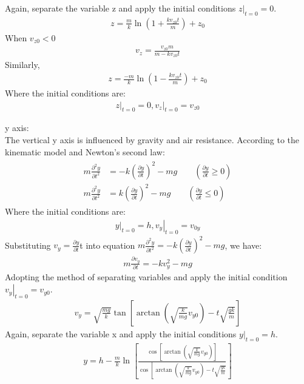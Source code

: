 Again, separate the variable z and apply the initial conditions $\left.z\right|_{t=0}=0$.
\begin{align}
     z=\frac{m}{k} \ln \left(1+\frac{k v_{z 0} t}{m}\right)+z_{0}   
\end{align}
When $v_{z 0}<0$
\begin{align}
    v_{z}=\frac{v_{z 0} m}{m-k v_{z 0} t}
\end{align}
Similarly,
\begin{align}
    z=\frac{-m}{k} \ln \left(1-\frac{k v_{z 0} t}{m}\right)+z_{0}
\end{align}
Where the initial conditions are:
\begin{align}
    \left.z\right|_{t=0}=0,\left.v_{z}\right|_{t=0}=v_{z 0}
\end{align}

y axis:\\
The vertical y axis is influenced by gravity and air resistance. According to the kinematic model and Newton’s second law:
\begin{align}
\begin{split}
   m \frac{\partial^{2} y}{\partial t^{2}}&=-k\left(\frac{\partial y}{\partial t}\right)^{2}-m g\qquad(\frac{\partial y}{\partial t} \geq 0)\\
   m \frac{\partial^{2} y}{\partial t^{2}}&=k\left(\frac{\partial y}{\partial t}\right)^{2}-m g\qquad(\frac{\partial y}{\partial t} \leq 0)
\end{split}
\end{align}
Where the initial conditions are:
\begin{align}
    \left.y\right|_{t=0}=h,\left.v_{y}\right|_{t=0}=v_{0 y}
\end{align}
Substituting $v_{y}=\frac{\partial y}{\partial t}$t into equation $m \frac{\partial^{2} y}{\partial t^{2}}=-k\left(\frac{\partial y}{\partial t}\right)^{2}-m g$, we have:
\begin{align}
    m \frac{\partial v_{y}}{\partial t}=-k v_{y}^{2}-m g
\end{align}
Adopting the method of separating variables and apply the initial condition $\left.v_{y}\right|_{t=0}=v_{y 0}$.
\begin{align}
    v_{y}=\sqrt{\frac{m g}{k}} \tan \left[\arctan \left(\sqrt{\frac{k}{m g}} v_{y 0}\right)-t \sqrt{\frac{g k}{m}}\right]
\end{align}
Again, separate the variable x and apply the initial conditions $\left.y\right|_{t=0}=h$.
\begin{align}
    y=h-\frac{m}{k} \ln \left[\frac{\cos \left[\arctan \left(\sqrt{\frac{k}{m g}} v_{y 0}\right)\right]}{\cos \left[\arctan \left(\sqrt{\frac{k}{m g}} v_{y 0}\right)-t \sqrt{\frac{g k}{m}}\right.}\right]
\end{align}
